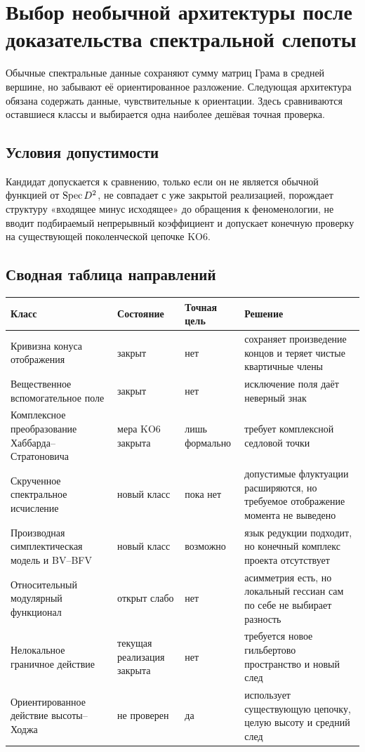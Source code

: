 \chapter{Выбор необычной архитектуры после доказательства спектральной слепоты}

Обычные спектральные данные сохраняют сумму матриц Грама в средней вершине,
но забывают её ориентированное разложение. Следующая архитектура обязана
содержать данные, чувствительные к ориентации. Здесь сравниваются оставшиеся
классы и выбирается одна наиболее дешёвая точная проверка.

\section{Условия допустимости}

Кандидат допускается к сравнению, только если он не является обычной
функцией от \(\operatorname{Spec} D^2\), не совпадает с уже закрытой реализацией,
порождает структуру «входящее минус исходящее» до обращения к феноменологии,
не вводит подбираемый непрерывный коэффициент и допускает конечную проверку
на существующей поколенческой цепочке KO6.

\section{Сводная таблица направлений}

\begin{center}\small
\begin{tabular}{>{\raggedright\arraybackslash}p{3.1cm}
                  >{\raggedright\arraybackslash}p{2.2cm}
                  >{\raggedright\arraybackslash}p{2.2cm}
                  >{\raggedright\arraybackslash}p{4.6cm}}
\toprule
Класс & Состояние & Точная цель & Решение\\
\midrule
Кривизна конуса отображения & закрыт & нет & сохраняет произведение концов и теряет чистые квартичные члены\\
Вещественное вспомогательное поле & закрыт & нет & исключение поля даёт неверный знак\\
Комплексное преобразование Хаббарда--Стратоновича & мера KO6 закрыта & лишь формально & требует комплексной седловой точки\\
Скрученное спектральное исчисление & новый класс & пока нет & допустимые флуктуации расширяются, но требуемое отображение момента не выведено\\
Производная симплектическая модель и BV--BFV & новый класс & возможно & язык редукции подходит, но конечный комплекс проекта отсутствует\\
Относительный модулярный функционал & открыт слабо & нет & асимметрия есть, но локальный гессиан сам по себе не выбирает разность\\
Нелокальное граничное действие & текущая реализация закрыта & нет & требуется новое гильбертово пространство и новый след\\
Ориентированное действие высоты--Ходжа & не проверен & да & использует существующую цепочку, целую высоту и средний след\\
\bottomrule
\end{tabular}
\end{center}

